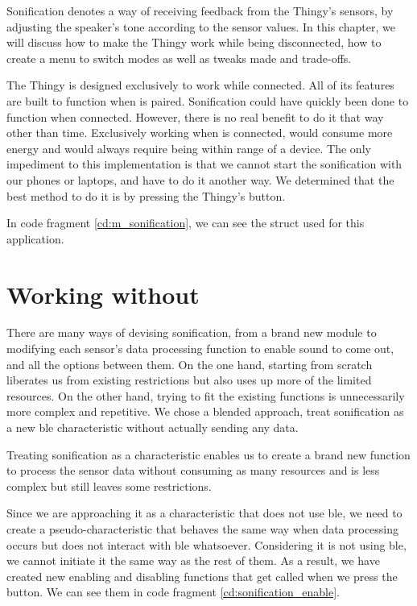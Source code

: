 Sonification denotes a way of receiving feedback from the Thingy's sensors, by adjusting the speaker's tone according to the sensor values. In this chapter, we will discuss how to make the Thingy work while being disconnected, how to create a menu to switch modes as well as tweaks made and trade-offs.

The Thingy is designed exclusively to work while connected. All of its features are built to function when \bt is paired. Sonification could have quickly been done to function when connected. However, there is no real benefit to do it that way other than time. Exclusively working when \bt is connected, would consume more energy and would always require being within range of a device. The only impediment to this implementation is that we cannot start the sonification with our phones or laptops, and have to do it another way. We determined that the best method to do it is by pressing the Thingy's button.

In code fragment \ref{cd:m_sonification}, we can see the struct used for this application.



\section{Working without \bt}
There are many ways of devising sonification, from a brand new module to modifying each sensor's data processing function to enable sound to come out, and all the options between them. On the one hand, starting from scratch liberates us from existing restrictions but also uses up more of the limited resources. On the other hand, trying to fit the existing functions is unnecessarily more complex and repetitive. We chose a blended approach, treat sonification as a new \gls{ble} characteristic without actually sending any data.

Treating sonification as a characteristic enables us to create a brand new function to process the sensor data without consuming as many resources and is less complex but still leaves some restrictions. 

Since we are approaching it as a characteristic that does not use \gls{ble}, we need to create a pseudo-characteristic that behaves the same way when data processing occurs but does not interact with \gls{ble} whatsoever. Considering it is not using \gls{ble}, we cannot initiate it the same way as the rest of them. As a result, we have created new enabling and disabling functions that get called when we press the button. We can see them in code fragment \ref{cd:sonification_enable}.

